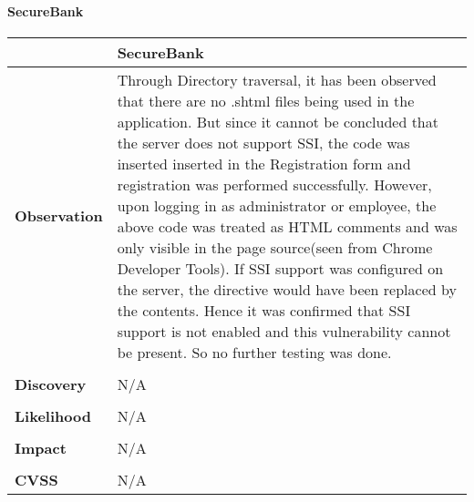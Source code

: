 \paragraph{SecureBank} \mbox{}
\begin{longtable*}{p{.20\textwidth} | p{.80\textwidth}}
    \hline
    & \textbf{SecureBank} \\
    \hline
    \textbf{Observation} &
       Through Directory traversal, it has been observed that there are no .shtml files being used in the application. But since it cannot be concluded that the server does not support SSI,
       	the code  was inserted inserted in the Registration form and registration was performed successfully.
       	However, upon logging in as administrator or employee, the above code was treated as HTML comments and was only visible in the page source(seen from Chrome Developer Tools).
       	If SSI support was configured on the server, the directive would have been replaced by the contents.
       	Hence it was confirmed that SSI support is not enabled and this vulnerability cannot be present. So no further testing was done.
    \\\\
    \textbf{Discovery} &
        N/A
    \\\\
    \textbf{Likelihood} &
        N/A
    \\\\
    \textbf{Impact} &
        N/A
    \\\\
    \textbf{CVSS} &
        N/A
    \\
    \hline
\end{longtable*}
\clearpage